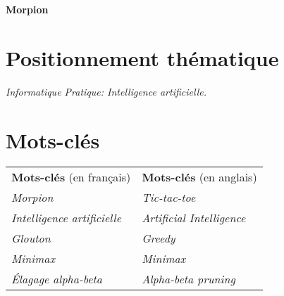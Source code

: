 \documentclass[12pt,a4paper]{article}
\begin{document}
\begin{center}
    {\huge \bfseries Morpion}
\end{center}
\section*{\bfseries Positionnement thématique}

\hspace*{7mm}\textit{Informatique Pratique: Intelligence artificielle.}

\section*{\bfseries Mots-clés}

\begin{tabular}{l l}
    {\bfseries Mots-clés} (en français) & {\bfseries Mots-clés} (en anglais)\\
    \textit{Morpion}& \textit{Tic-tac-toe}\\
    \textit{Intelligence artificielle} & \textit{Artificial Intelligence}\\
    \textit{Glouton} & \textit{Greedy}\\
    \textit{Minimax} & \textit{Minimax}\\
    \textit{Élagage alpha-beta} & \textit{Alpha-beta pruning}
\end{tabular}
\end{document}
